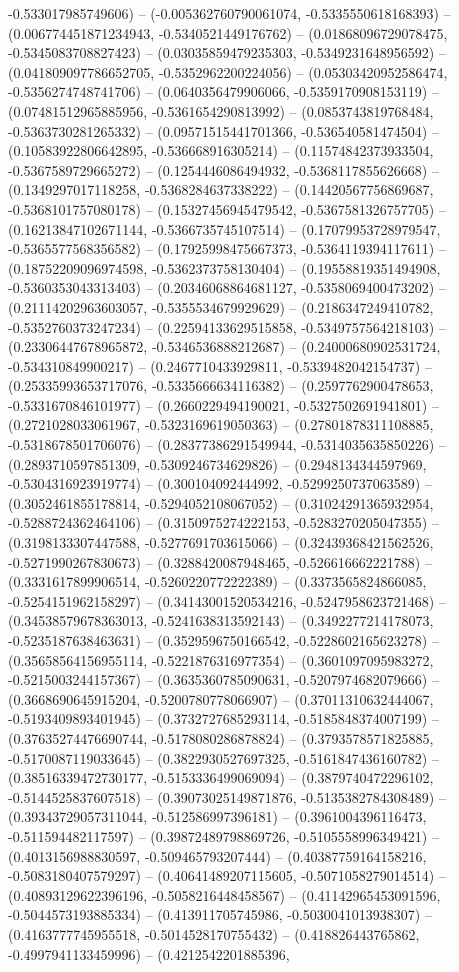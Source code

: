 -0.533017985749606) -- (-0.005362760790061074, -0.5335550618168393) -- (0.006774451871234943, -0.5340521449176762) -- (0.01868096729078475, -0.5345083708827423) -- (0.03035859479235303, -0.5349231648956592) -- (0.041809097786652705, -0.5352962200224056) -- (0.05303420952586474, -0.5356274748741706) -- (0.0640356479906066, -0.5359170908153119) -- (0.07481512965885956, -0.5361654290813992) -- (0.0853743819768484, -0.5363730281265332) -- (0.09571515441701366, -0.536540581474504) -- (0.10583922806642895, -0.536668916305214) -- (0.11574842373933504, -0.5367589729665272) -- (0.1254446086494932, -0.5368117855626668) -- (0.1349297017118258, -0.5368284637338222) -- (0.14420567756869687, -0.5368101757080178) -- (0.15327456945479542, -0.5367581326757705) -- (0.16213847102671144, -0.5366735745107514) -- (0.17079953728979547, -0.5365577568356582) -- (0.17925998475667373, -0.5364119394117611) -- (0.18752209096974598, -0.5362373758130404) -- (0.19558819351494908, -0.5360353043313403) -- (0.20346068864681127, -0.5358069400473202) -- (0.21114202963603057, -0.5355534679929629) -- (0.2186347249410782, -0.5352760373247234) -- (0.22594133629515858, -0.5349757564218103) -- (0.23306447678965872, -0.5346536888212687) -- (0.24000680902531724, -0.534310849900217) -- (0.2467710433929811, -0.5339482042154737) -- (0.25335993653717076, -0.5335666634116382) -- (0.2597762900478653, -0.5331670846101977) -- (0.2660229494190021, -0.5327502691941801) -- (0.2721028033061967, -0.5323169619050363) -- (0.27801878311108885, -0.5318678501706076) -- (0.28377386291549944, -0.5314035635850226) -- (0.2893710597851309, -0.5309246734629826) -- (0.2948134344597969, -0.5304316923919774) -- (0.300104092444992, -0.5299250737063589) -- (0.3052461855178814, -0.5294052108067052) -- (0.31024291365932954, -0.5288724362464106) -- (0.3150975274222153, -0.5283270205047355) -- (0.3198133307447588, -0.5277691703615066) -- (0.32439368421562526, -0.5271990267830673) -- (0.3288420087948465, -0.526616662221788) -- (0.3331617899906514, -0.5260220772222389) -- (0.3373565824866085, -0.5254151962158297) -- (0.34143001520534216, -0.5247958623721468) -- (0.34538579678363013, -0.5241638313592143) -- (0.3492277214178073, -0.5235187638463631) -- (0.3529596750166542, -0.5228602165623278) -- (0.35658564156955114, -0.5221876316977354) -- (0.3601097095983272, -0.5215003244157367) -- (0.3635360785090631, -0.5207974682079666) -- (0.3668690645915204, -0.5200780778066907) -- (0.37011310632444067, -0.5193409893401945) -- (0.3732727685293114, -0.5185848374007199) -- (0.37635274476690744, -0.5178080286878824) -- (0.3793578571825885, -0.5170087119033645) -- (0.3822930527697325, -0.5161847436160782) -- (0.38516339472730177, -0.5153336499069094) -- (0.3879740472296102, -0.5144525837607518) -- (0.39073025149871876, -0.5135382784308489) -- (0.39343729057311044, -0.512586997396181) -- (0.3961004396116473, -0.511594482117597) -- (0.39872489798869726, -0.5105558996349421) -- (0.4013156988830597, -0.509465793207444) -- (0.40387759164158216, -0.5083180407579297) -- (0.40641489207115605, -0.5071058279014514) -- (0.40893129622396196, -0.5058216448458567) -- (0.41142965453091596, -0.5044573193885334) -- (0.413911705745986, -0.5030041013938307) -- (0.4163777745955518, -0.5014528170755432) -- (0.418826443765862, -0.4997941133459996) -- (0.4212542201885396, 